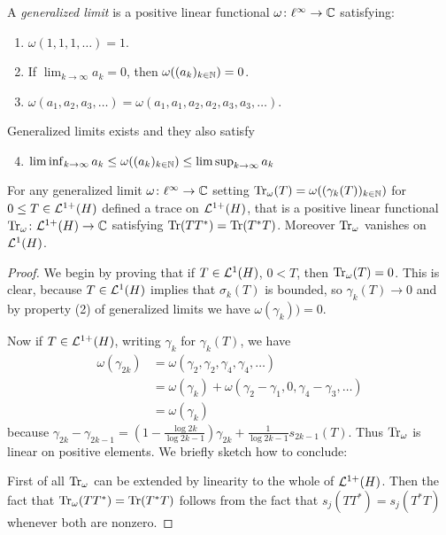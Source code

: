\begin{definition}
 A \emph{generalized limit} is a positive linear functional $\omega\colon\ell^\infty\to\Bbb C$ satisfying:
 \begin{enumerate}
  \item $\omega(1,1,1,\ldots)=1$.
  \item If $\lim_{k\to\infty} a_k=0$, then $\omega((a_k)_{k\in\mathbb{N}})=0$.
  \item $\omega(a_1,a_2,a_3,\ldots)=\omega(a_1,a_1,a_2,a_2,a_3,a_3,\ldots)$.
 \end{enumerate}
\end{definition}

\begin{lemma}
 Generalized limits exists and they also satisfy 
\begin{enumerate}\setcounter{enumi}{3}
 \item $\liminf_{k\to\infty}a_k\leq\omega((a_k)_{k\in\mathbb{N}})\leq\limsup_{k\to\infty}a_k$
\end{enumerate}
\end{lemma}

\begin{proposition}
 For any generalized limit $\omega\colon\ell^\infty\to\mathbb{C}$ setting $\mathrm{Tr}_\omega(T)=\omega((\gamma_k(T))_{k\in\mathbb{N}})$ for $0\leq T\in\mathcal{L}^{1+}(H)$ defined a trace on $\mathcal{L}^{1+}(H)$, that is a positive linear functional $\mathrm{Tr}_\omega\colon\mathcal{L}^{1+}(H)\to\mathbb{C}$ satisfying $\mathrm{Tr}(TT^\ast)=\mathrm{Tr}(T^\ast T)$. Moreover $\mathrm{Tr}_\omega$ vanishes on $\mathcal{L}^1(H)$.
\end{proposition}
\begin{proof}
 We begin by proving that if $T\in\mathcal{L}^1(H)$, $0<T$, then $\mathrm{Tr}_\omega(T)=0$. This is clear, because $T\in\mathcal{L}^1(H)$ implies that $\sigma_k(T)$ is bounded, so $\gamma_k(T)\to 0$ and by property (2) of generalized limits we have $\omega(\gamma_k))=0$.
 
 \noindent Now if $T\in\mathcal{L}^{1+}(H)$, writing $\gamma_k$ for $\gamma_k(T)$, we have 
 \begin{align*}
  \omega(\gamma_{2k})&=\omega(\gamma_2,\gamma_2,\gamma_4,\gamma_4,\ldots)\\
  &=\omega(\gamma_k)+\omega(\gamma_2-\gamma_1,0,\gamma_4-\gamma_3,\ldots)\\
  &=\omega(\gamma_k)
 \end{align*}
because $\gamma_{2k}-\gamma_{2k-1}=\left(1-\frac{\log 2k}{\log 2k-1}\right)\gamma_{2k}+\frac1{\log 2k-1}s_{2k-1}(T)$.
Thus $\mathrm{Tr}_\omega$ is linear on positive elements. We briefly sketch how to conclude:

\noindent First of all $\mathrm{Tr}_\omega$ can be extended by linearity to the whole of $\mathcal{L}^{1+}(H)$. Then the fact that $\mathrm{Tr}_\omega(TT^\ast)=\mathrm{Tr}(T^\ast T)$ follows from the fact that $s_j(TT^\ast)=s_j(T^\ast T)$ whenever both are nonzero.
\end{proof}

